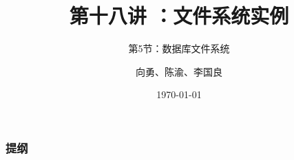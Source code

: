 


\title[第18讲]{第十八讲 ：文件系统实例} %
\subtitle{第5节：数据库文件系统}
\author{向勇、陈渝、李国良} %
\date{\today} %

\usepackage[absolute,overlay]{textpos}



\begin{frame}
\titlepage %
\end{frame}

\begin{frame}
\frametitle{提纲} %
\tableofcontents %

\end{frame}
% 
% 
% 
% 
